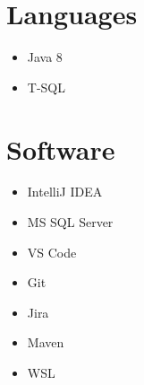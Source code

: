 \documentclass[letterpaper,11pt]{article}
\begin{document}
\hspace{0.2cm}
\begin{minipage}[t]{0.15\linewidth}
	\section{Languages}
	\begin{itemize}[leftmargin=*]
		\item Java 8
		\item T-SQL
	\end{itemize}
	\section{Software}
	\begin{itemize}[leftmargin=*]
		\item IntelliJ IDEA
		\item MS SQL Server
		\item VS Code
		\item Git
		\item Jira
		\item Maven
		\item WSL
	\end{itemize}
\end{minipage}


\end{document}
